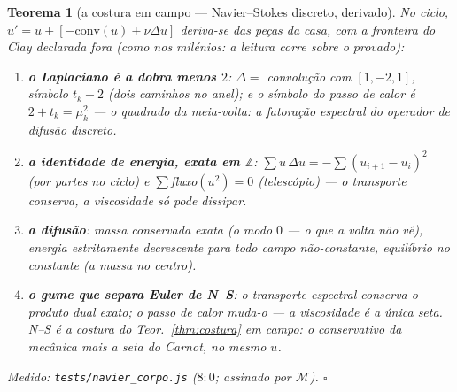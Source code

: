 \documentclass[11pt,a4paper]{article}
\newtheorem{teorema}{Teorema}
\newcommand{\code}[1]{\texttt{\small #1}}
\begin{document}
\begin{teorema}[a costura em campo --- Navier--Stokes discreto,
derivado]\label{thm:navier}
No ciclo, $u'=u+[-\mathrm{conv}(u)+\nu\Delta u]$ deriva-se das peças
da casa, com a fronteira do Clay declarada \emph{fora} (como nos
milénios: a leitura corre sobre o provado):
\begin{enumerate}
\item \textbf{o Laplaciano é a dobra menos $2$}: $\Delta=$
convolução com $[1,-2,1]$, símbolo $t_{k}-2$ (dois caminhos no anel);
e o símbolo do passo de calor é
$2+t_{k}=\mu_{k}^{2}$ --- \emph{o quadrado da meia-volta}: a
fatoração espectral do operador de difusão discreto.
\item \textbf{a identidade de energia, exata em $\mathbb{Z}$}:
$\sum u\,\Delta u=-\sum(u_{i+1}-u_{i})^{2}$ (por partes no ciclo)
e $\sum$fluxo$(u^{2})=0$ (telescópio) --- o transporte
\emph{conserva}, a viscosidade \emph{só pode dissipar}.
\item \textbf{a difusão}: massa conservada exata (o modo $0$ --- o
que a volta não vê), energia estritamente decrescente para todo campo
não-constante, equilíbrio no constante (a massa no centro).
\item \textbf{o gume que separa Euler de N--S}: o transporte
espectral conserva o produto dual exato; o passo de calor muda-o ---
\emph{a viscosidade é a única seta}. N--S é a costura do
Teor.~\ref{thm:costura} em campo: o conservativo da mecânica mais a
seta do Carnot, no mesmo $u$.
\end{enumerate}
\emph{Medido:} \code{tests/navier\_corpo.js} ($8{:}0$; assinado por
$\mathcal{M}$).
$\square$
\end{teorema}
\end{document}
